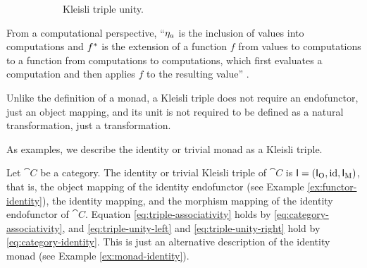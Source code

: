 \begin{definition}
\begin{figure}[htb]
\begin{subfigure}[b]{0.45\linewidth}
\begin{center}
      \end{center}
      \caption{Kleisli triple unity.}
      \label{fig:triple-unity}
    \end{subfigure}
    \caption{}
  \end{figure}

\end{definition}

\begin{remark}
  \label{re:triple}

  From a computational perspective, ``$\natO{\eta}{a}$ is the
  inclusion of values into computations and $\monM{T}{f}$ is the
  extension of a function $f$ from values to computations to a
  function from computations to computations, which first evaluates a
  computation and then applies $f$ to the resulting value''
  \parencite[59]{moggi-1991}.

\end{remark}

\begin{remark}
  \label{re:monad-triple}

  Unlike the definition of a monad, a Kleisli triple does not require
  an endofunctor, just an object mapping, and its unit is not required
  to be defined as a natural transformation, just a transformation.

\end{remark}

As examples, we describe the identity or trivial monad as a Kleisli
triple.

\begin{example}
  \label{ex:triple-identity}

  Let $\cat{C}$ be a category. The identity or trivial Kleisli triple
  of $\cat{C}$ is $\mon{I} = (\funcO{I}, \id, \funcM{I})$, that is,
  the object mapping of the identity endofunctor (see Example
  \ref{ex:functor-identity}), the identity mapping, and the morphism
  mapping of the identity endofunctor of $\cat{C}$. Equation
  \eqref{eq:triple-associativity} holds by
  \eqref{eq:category-associativity}, and \eqref{eq:triple-unity-left}
  and \eqref{eq:triple-unity-right} hold by
  \eqref{eq:category-identity}. This is just an alternative
  description of the identity monad (see Example
  \ref{ex:monad-identity}).

\end{example}

